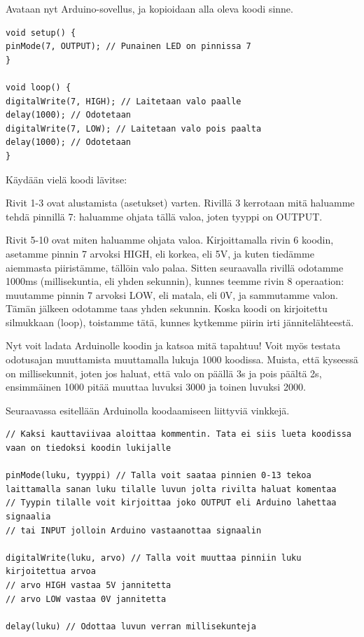 Avataan nyt Arduino-sovellus, ja kopioidaan alla oleva koodi sinne.


\begin{lstlisting}[numbers=none]
void setup() {
pinMode(7, OUTPUT); // Punainen LED on pinnissa 7
}

void loop() {
digitalWrite(7, HIGH); // Laitetaan valo paalle
delay(1000); // Odotetaan
digitalWrite(7, LOW); // Laitetaan valo pois paalta
delay(1000); // Odotetaan
}
\end{lstlisting}


Käydään vielä koodi lävitse: 

Rivit 1-3 ovat alustamista (asetukset) varten. Rivillä 3 kerrotaan mitä haluamme tehdä pinnillä 7: haluamme ohjata tällä valoa, joten tyyppi on OUTPUT.

Rivit 5-10 ovat miten haluamme ohjata valoa. Kirjoittamalla rivin 6 koodin, asetamme pinnin 7 arvoksi HIGH, eli korkea, eli 5V, ja kuten tiedämme aiemmasta piiristämme, tällöin valo palaa. Sitten seuraavalla rivillä odotamme 1000ms (millisekuntia, eli yhden sekunnin), kunnes teemme rivin 8 operaation: muutamme pinnin 7 arvoksi LOW, eli matala, eli 0V, ja sammutamme valon. Tämän jälkeen odotamme taas yhden sekunnin. Koska koodi on kirjoitettu silmukkaan (loop), toistamme tätä, kunnes kytkemme piirin irti jännitelähteestä.

Nyt voit ladata Arduinolle koodin ja katsoa mitä tapahtuu! Voit myös testata odotusajan muuttamista muuttamalla lukuja 1000 koodissa. Muista, että kyseessä on millisekunnit, joten jos haluat, että valo on päällä 3s ja pois päältä 2s, ensimmäinen 1000 pitää muuttaa luvuksi 3000 ja toinen luvuksi 2000. 

\begin{tcolorbox}[colback=white,title=Vinkkejä Arduinolla koodaamiseen!,colbacktitle=purple!90]
Seuraavassa esitellään Arduinolla koodaamiseen liittyviä vinkkejä. 
\begin{lstlisting}
// Kaksi kauttaviivaa aloittaa kommentin. Tata ei siis lueta koodissa vaan on tiedoksi koodin lukijalle

pinMode(luku, tyyppi) // Talla voit saataa pinnien 0-13 tekoa laittamalla sanan luku tilalle luvun jolta rivilta haluat komentaa
// Tyypin tilalle voit kirjoittaa joko OUTPUT eli Arduino lahettaa signaalia
// tai INPUT jolloin Arduino vastaanottaa signaalin

digitalWrite(luku, arvo) // Talla voit muuttaa pinniin luku kirjoitettua arvoa
// arvo HIGH vastaa 5V jannitetta
// arvo LOW vastaa 0V jannitetta

delay(luku) // Odottaa luvun verran millisekunteja
\end{lstlisting}
\end{tcolorbox}

